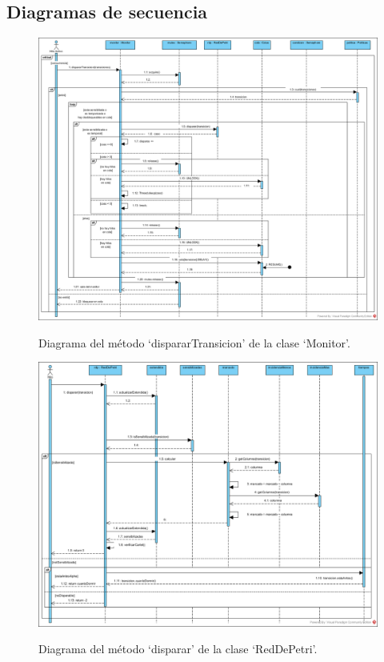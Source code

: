 \documentclass[12pt,a4paper]{article}
\begin{document}
\subsection{Diagramas de secuencia}
\begin{figure}[H]
    \centering
    \includegraphics[width=15.5cm]{DSmonitor.png}
    \label{fig:dsmonitor}
    \caption{Diagrama del método `dispararTransicion' de la clase `Monitor'.}
\end{figure}

\begin{figure}[H]
    \centering
    \includegraphics[width=15.5cm]{DSdisparo.png}
    \label{fig:dsdisparo}
    \caption{Diagrama del método `disparar' de la clase `RedDePetri'.}
\end{figure}
\end{document}
